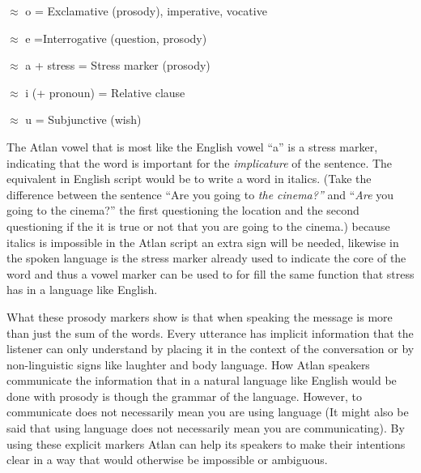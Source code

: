 \begin{itemize}
{\small
\item[\kern-0.4em\Atlano]   $\approx$ o = Exclamative (prosody), imperative, vocative 

\item[\Atlane]  $\approx$ e =Interrogative (question, prosody\footnotemark)    

\item[\Atlana]   $\approx$ a + stress = Stress marker (prosody) 

\item[\kern0.4em\Atlani]   $\approx$ i (+ pronoun) = Relative clause   

\item[\Atlanu]   $\approx$ u  = Subjunctive (wish)
	}
\end{itemize}

\noindent The Atlan vowel that is most like the English vowel “a” is a stress marker, indicating that the word is important for the \textit{implicature} of the sentence. The equivalent in English script would be to write a word in italics. (Take the difference between the sentence “Are you going to \textit{the cinema?”} and “\textit{Are} you going to the cinema?” the first questioning the location and the second questioning if the it is true or not that you are going to the cinema.) because italics is impossible in the Atlan script an extra sign will be needed, likewise in the spoken language is the stress marker already used to indicate the core of the word and thus a vowel marker can be used to for fill the same function that stress has in a language like English.  

What these prosody markers show is that when speaking the message is more than just the sum of the words. Every utterance has implicit information that the listener can only understand by placing it in the context of the conversation or by non-linguistic signs like laughter and body language. How Atlan speakers communicate the information that in a natural language like English would be done with prosody is though the grammar of the language. However, to communicate does not necessarily mean you are using language (It might also be said that using language does not necessarily mean you are communicating). By using these explicit markers Atlan can help its speakers to make their intentions clear in a way that would otherwise be impossible or ambiguous. 

